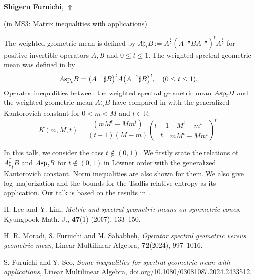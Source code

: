 \documentclass[ILAS2025-program.tex]{subfiles}
\begin{document}
     \hypertarget{down0144}{}\begin{ilasabstract}
    
    \textbf{Shigeru Furuichi},  \hfill \hyperlink{up0144}{$\Uparrow$}
    
    (in {\color{mstitle}MS3: Matrix inequalities with applications})
        
        \mtskip
    \begin{bibunit}
        The weighted geometric mean is defined by $A\sharp_t B:=A^{\frac{1}{2}}\left(A^{-\frac{1}{2}}BA^{-\frac{1}{2}}\right)^t A^{\frac{1}{2}}$ for positive invertible operators $A,B$ and $0\leq t\leq 1.$ 
The weighted spectral geometric mean was defined in \cite{Lee1} by
\[A{{{\rm sp}}_{t}}B={{\left( {{A}^{-1}}\sharp B \right)}^{t}}A{{\left( {{A}^{-1}}\sharp B \right)}^{t}},\quad (0\leq t\leq 1).\]
Operator inequalities between the weighted spectral geometric mean $A{\rm sp}_t B$ and the weighted geometric mean $A\sharp_tB$ have compared in \cite{MFS2023} with the generalized Kantorovich constant for $0<m<M$ and $t\in \mathbb{R}$:
\[K\left( m,M,t \right)=\frac{\left(m{{M}^{t}}-M{{m}^{t}}\right)}{\left( t-1 \right)\left( M-m \right)}{{\left( \frac{t-1}{t}\frac{{{M}^{t}}-{{m}^{t}}}{m{{M}^{t}}-M{{m}^{t}}} \right)}^{t}}.\]
	
In this talk, we consider the case $t\notin (0,1)$. We firstly state the relations of $A\hat\sharp_t B$ and $A{{\hat{\rm sp}}_{t}}B$ for $t\notin (0,1)$ in L\"{o}wner order with the generalized Kantorovich constant. Norm inequalities are also shown for them.
We also give log--majorization and the bounds for the Tsallis relative entropy as its application.
Our talk is based on the results in \cite{FS2024}.


\begin{thebibliography}{5}

 H. Lee and Y. Lim, {\it Metric and spectral geometric means on symmetric cones}, Kyungpook Math. J., {\bf47}(1) (2007), 133--150.

H. R. Moradi, S. Furuichi and M. Sababheh, {\it Operator spectral geometric versus geometric mean}, 	Linear Multilinear Algebra, {\bf 72}(2024), 997--1016.


 S. Furuichi and Y. Seo, {\it Some inequalities for spectral geometric mean
with applications}, Linear Multilinear Algebra, \url{doi.org/10.1080/03081087.2024.2433512}.
\end{thebibliography}
        \end{bibunit}
        \end{ilasabstract}
\end{document}
